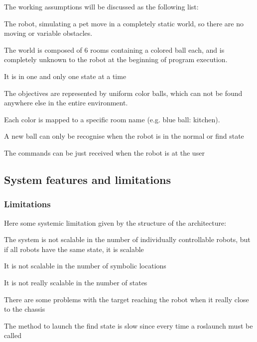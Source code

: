 The working assumptions will be discussed as the following list\+:
\begin{DoxyItemize}
\item The robot, simulating a pet move in a completely static world, so there are no moving or variable obstacles.
\item The world is composed of 6 rooms containing a colored ball each, and is completely unknown to the robot at the beginning of program execution.
\item It is in one and only one state at a time
\item The objectives are represented by uniform color balls, which can not be found anywhere else in the entire environment.
\item Each color is mapped to a specific room name (e.\+g. blue ball\+: kitchen).
\item A new ball can only be recognise when the robot is in the normal or find state
\item The commands can be just received when the robot is at the user
\end{DoxyItemize}

\subsection*{System features and limitations}

\subsubsection*{Limitations}

Here some systemic limitation given by the structure of the architecture\+:
\begin{DoxyItemize}
\item The system is not scalable in the number of individually controllable robots, but if all robots have the same state, it is scalable
\item It is not scalable in the number of symbolic locations
\item It is not really scalable in the number of states
\item There are some problems with the target reaching the robot when it really close to the chassis
\item The method to launch the find state is slow since every time a roslaunch must be called
\end{DoxyItemize}

